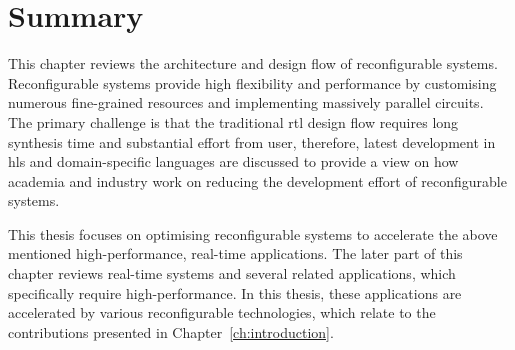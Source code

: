 

\section{Summary}
\label{sec:bg_summary}

This chapter reviews the architecture and design flow of reconfigurable systems.
Reconfigurable systems provide high flexibility and performance by customising numerous fine-grained resources and implementing massively parallel circuits.
The primary challenge is that the traditional \gls{rtl} design flow requires long synthesis time and substantial effort from user, therefore, latest development in \gls{hls} and domain-specific languages are discussed to provide a view on how academia and industry work on reducing the development effort of reconfigurable systems.

This thesis focuses on optimising reconfigurable systems to accelerate the above mentioned high-performance, real-time applications.
The later part of this chapter reviews real-time systems and several related applications, which specifically require high-performance.
In this thesis, these applications are accelerated by various reconfigurable technologies, which relate to the contributions presented in Chapter~\ref{ch:introduction}.
